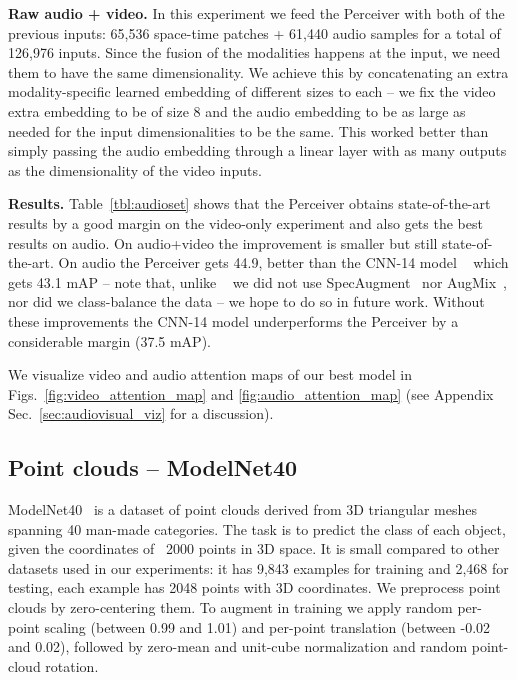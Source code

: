 \documentclass{article}
\begin{document}
\noindent \textbf{Raw audio + video.} In this experiment we feed  the Perceiver with both of the previous inputs: 65,536 space-time patches + 61,440 audio samples for a total of 126,976 inputs. Since the fusion of the modalities happens at the input, we need them to have the same dimensionality. We achieve this by concatenating an extra modality-specific learned embedding of different sizes to each -- we fix the video extra embedding to be of size 8 and the audio embedding to be as large as needed for the input dimensionalities to be the same. This worked better than simply passing the audio embedding through a linear layer with as many outputs as the dimensionality of the video inputs.

\noindent \textbf{Results.} Table~\ref{tbl:audioset} shows that the Perceiver obtains state-of-the-art results by a good margin on the video-only experiment and  also gets the best results on audio. On audio+video the improvement is smaller but still state-of-the-art. On audio the Perceiver gets 44.9, better than the CNN-14 model ~\cite{kong2020panns} which gets 43.1 mAP -- note that, unlike ~\cite{kong2020panns} we did not use SpecAugment~\cite{park2019specaugment} nor AugMix~\cite{hendrycks2019augmix}, nor did we class-balance the data -- we hope to do so in future work. Without these improvements the CNN-14 model underperforms the Perceiver by a considerable margin (37.5 mAP). 

We visualize video and audio attention maps of our best model in Figs.~\ref{fig:video_attention_map} and \ref{fig:audio_attention_map} (see Appendix Sec.~\ref{sec:audiovisual_viz} for a discussion).

\subsection{Point clouds -- ModelNet40}

ModelNet40~\cite{wu20153d} is a dataset of point clouds derived from 3D triangular meshes spanning 40 man-made categories. The task is to predict the class of each object, given the coordinates of ~2000 points in 3D space. It is small compared to other datasets used in our experiments: it has 9,843 examples for training and 2,468 for testing, each example has 2048 points with 3D coordinates. We preprocess point clouds by zero-centering them. To augment in training we apply random per-point scaling (between 0.99 and 1.01) and per-point translation (between -0.02 and 0.02), followed by zero-mean and unit-cube normalization and random point-cloud rotation.
\end{document}
